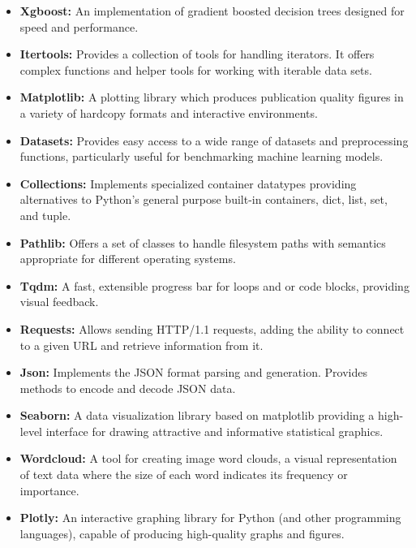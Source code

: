 \begin{itemize}
    \item \textbf{Xgboost:} An implementation of gradient boosted decision trees designed for speed and performance.
    \item \textbf{Itertools:} Provides a collection of tools for handling iterators. It offers complex functions and helper tools for working with iterable data sets.
    \item \textbf{Matplotlib:} A plotting library which produces publication quality figures in a variety of hardcopy formats and interactive environments.
    \item \textbf{Datasets:} Provides easy access to a wide range of datasets and preprocessing functions, particularly useful for benchmarking machine learning models.
    \item \textbf{Collections:} Implements specialized container datatypes providing alternatives to Python’s general purpose built-in containers, dict, list, set, and tuple.
    \item \textbf{Pathlib:} Offers a set of classes to handle filesystem paths with semantics appropriate for different operating systems.
    \item \textbf{Tqdm:} A fast, extensible progress bar for loops and or code blocks, providing visual feedback.
    \item \textbf{Requests:} Allows sending HTTP/1.1 requests, adding the ability to connect to a given URL and retrieve information from it.
    \item \textbf{Json:} Implements the JSON format parsing and generation. Provides methods to encode and decode JSON data.
    \item \textbf{Seaborn:} A data visualization library based on matplotlib providing a high-level interface for drawing attractive and informative statistical graphics.
    \item \textbf{Wordcloud:} A tool for creating image word clouds, a visual representation of text data where the size of each word indicates its frequency or importance.
    \item \textbf{Plotly:} An interactive graphing library for Python (and other programming languages), capable of producing high-quality graphs and figures.
\end{itemize}

\color{black}